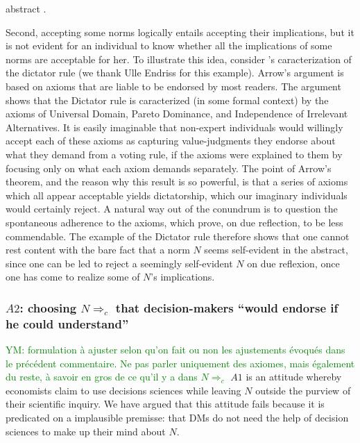 \documentclass[preprint, french, english, 11pt, authoryear]{elsarticle}%
\newcommand{\protectforpdf}[1]{\texorpdfstring{\ensuremath{#1}}{#1}}
\newcommand{\commentYM}[1]{\textcolor{green}{YM: #1}}
\begin{document}
abstract \citep{sen_maximization_1997}.

Second, accepting some norms logically entails accepting their implications, but it is not evident for an individual to know whether all the implications of some norms are acceptable for her. To illustrate this idea, consider \citeauthor{arrow_social_2012}’s \citeyearpar{arrow_social_2012} caracterization of the dictator rule (we thank Ulle Endriss for this example). Arrow's argument is based on axioms that are liable to be endorsed by most readers. The argument shows that the Dictator rule is caracterized (in some formal context) by the axioms of Universal Domain, Pareto Dominance, and Independence of Irrelevant Alternatives. It is easily imaginable that non-expert individuals would willingly accept each of these axioms as capturing value-judgments they endorse about what they demand from a voting rule, if the axioms were explained to them by focusing only on what each axiom demands separately. The point of Arrow's theorem, and the reason why this result is so powerful, is that a series of axioms which all appear acceptable yields dictatorship, which our imaginary individuals would certainly reject. A natural way out of the conundrum is to question the spontaneous adherence to the axioms, which prove, on due reflection, to be less commendable. The example of the Dictator rule therefore shows that one cannot rest content with the bare fact that a norm $N$ seems self-evident in the abstract, since one can be led to reject a seemingly self-evident $N$ on due reflexion, once one has come to realize some of $N$'s implications.

\subsubsection{\protectforpdf{A2}: choosing \protectforpdf{N⇒_c} that decision-makers “would endorse if he could understand”}\commentYM{formulation à ajuster selon qu'on fait ou non les ajustements évoqués dans le précédent commentaire. Ne pas parler uniquement des axiomes, mais également du reste, à savoir en gros de ce qu'il y a dans $N⇒_c$}
$A1$ is an attitude whereby economists claim to use decisions sciences while leaving $N$ outside the purview of their scientific inquiry. We have argued that this attitude fails because it is predicated on a implausible premisse: that \acp{DM} do not need the help of decision sciences to make up their mind about $N$. 
\end{document}
